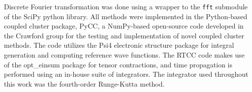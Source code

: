 Discrete Fourier transformation was done using a wrapper to the \texttt{fft} submodule
of the SciPy python library.\cite{scipy} 
All methods were implemented in the Python-based coupled
cluster package, PyCC\cite{pycc}, a NumPy-based\cite{numpy} open-source code developed 
in the Crawford group for the testing and implementation of novel coupled cluster methods. 
The code utilizes the Psi4 electronic
structure package\cite{Smith2020} for integral generation and computing reference 
wave functions. 
The RTCC code makes use of the opt\_einsum package\cite{opteinsum} for tensor contractions,
and time propagation is performed using an in-house suite of integrators. The integrator
used throughout this work was the fourth-order Runge-Kutta method.\cite{rk}

